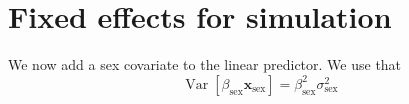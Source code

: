\documentclass[
]{article}
\newenvironment{Shaded}{\begin{snugshade}}{\end{snugshade}}
\newcommand{\AttributeTok}[1]{\textcolor[rgb]{0.13,0.29,0.53}{#1}}
\newcommand{\FunctionTok}[1]{\textcolor[rgb]{0.13,0.29,0.53}{\textbf{#1}}}
\newcommand{\NormalTok}[1]{#1}
\newcommand{\SpecialCharTok}[1]{\textcolor[rgb]{0.81,0.36,0.00}{\textbf{#1}}}
\newcommand{\StringTok}[1]{\textcolor[rgb]{0.31,0.60,0.02}{#1}}
\begin{document}
\begin{Shaded}
\end{Shaded}

\hypertarget{fixed-effects-for-simulation}{%
\section*{Fixed effects for
simulation}\label{fixed-effects-for-simulation}}

We now add a sex covariate to the linear predictor. We use that \[
\operatorname{Var}[\beta_{\text{sex}}\mathbf{x}_{\text{sex}}] = \beta_{\text{sex}}^2  \sigma^2_\text{sex}
\]
\end{document}
